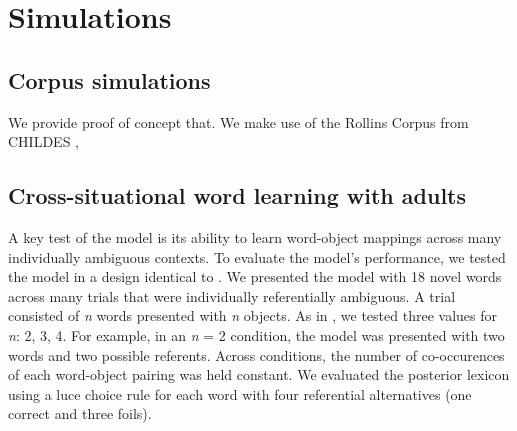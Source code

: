 \documentclass[man,noapacite,12pt]{apa2}
\newcommand{\vect}[1]{\accentset{\rightharpoonup}{#1}}
\begin{document}
 




%
%
%
%
%
%

\section{Simulations}


\subsection{Corpus simulations}

We provide proof of concept that.
We make use of the Rollins Corpus from CHILDES \cite{macwhinney2000}, 

\subsection{Cross-situational word learning with adults}
A key test of the model is its ability to learn word-object mappings across many individually ambiguous contexts. To evaluate the model's performance, we tested the model in a design identical to . We presented the model with 18 novel words across many trials that were individually referentially ambiguous. A trial consisted of  {\it n} words presented with {\it n}  objects. As in , we tested three values for  {\it n}: 2, 3, 4. For example, in an {\it n} = 2 condition, the model was presented with two words and two possible referents. Across conditions, the number of co-occurences of each word-object pairing was held constant. We evaluated the posterior lexicon using a luce choice rule for each word with four referential alternatives (one correct and three foils). 
\end{document}
